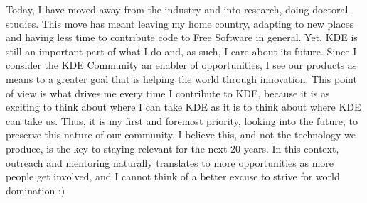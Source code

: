 Today, I have moved away from the industry and into research, doing
doctoral studies. This move has meant leaving my home country,
adapting to new places and having less time to contribute code to Free
Software in general. Yet, KDE is still an important part of what I do
and, as such, I care about its future. Since I consider the KDE
Community an enabler of opportunities, I see our products as means to
a greater goal that is helping the world through innovation. This
point of view is what drives me every time I contribute to KDE,
because it is as exciting to think about where I can take KDE as it is
to think about where KDE can take us. Thus, it is my first and
foremost priority, looking into the future, to preserve this nature of
our community. I believe this, and not the technology we produce, is
the key to staying relevant for the next 20 years. In this context, outreach
and mentoring naturally translates to more opportunities as more
people get involved, and I cannot think of a better excuse to strive
for world domination :)
